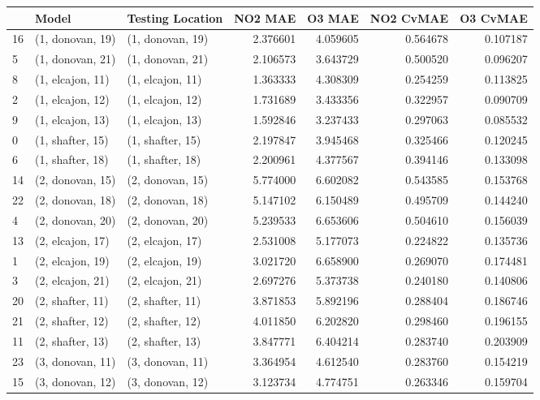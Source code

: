 \begin{tabular}{lllrrrr}
\toprule
{} &             Model &  Testing Location &   NO2 MAE &    O3 MAE &  NO2 CvMAE &  O3 CvMAE \\
\midrule
16 &  (1, donovan, 19) &  (1, donovan, 19) &  2.376601 &  4.059605 &   0.564678 &  0.107187 \\
5  &  (1, donovan, 21) &  (1, donovan, 21) &  2.106573 &  3.643729 &   0.500520 &  0.096207 \\
8  &  (1, elcajon, 11) &  (1, elcajon, 11) &  1.363333 &  4.308309 &   0.254259 &  0.113825 \\
2  &  (1, elcajon, 12) &  (1, elcajon, 12) &  1.731689 &  3.433356 &   0.322957 &  0.090709 \\
9  &  (1, elcajon, 13) &  (1, elcajon, 13) &  1.592846 &  3.237433 &   0.297063 &  0.085532 \\
0  &  (1, shafter, 15) &  (1, shafter, 15) &  2.197847 &  3.945468 &   0.325466 &  0.120245 \\
6  &  (1, shafter, 18) &  (1, shafter, 18) &  2.200961 &  4.377567 &   0.394146 &  0.133098 \\
14 &  (2, donovan, 15) &  (2, donovan, 15) &  5.774000 &  6.602082 &   0.543585 &  0.153768 \\
22 &  (2, donovan, 18) &  (2, donovan, 18) &  5.147102 &  6.150489 &   0.495709 &  0.144240 \\
4  &  (2, donovan, 20) &  (2, donovan, 20) &  5.239533 &  6.653606 &   0.504610 &  0.156039 \\
13 &  (2, elcajon, 17) &  (2, elcajon, 17) &  2.531008 &  5.177073 &   0.224822 &  0.135736 \\
1  &  (2, elcajon, 19) &  (2, elcajon, 19) &  3.021720 &  6.658900 &   0.269070 &  0.174481 \\
3  &  (2, elcajon, 21) &  (2, elcajon, 21) &  2.697276 &  5.373738 &   0.240180 &  0.140806 \\
20 &  (2, shafter, 11) &  (2, shafter, 11) &  3.871853 &  5.892196 &   0.288404 &  0.186746 \\
21 &  (2, shafter, 12) &  (2, shafter, 12) &  4.011850 &  6.202820 &   0.298460 &  0.196155 \\
11 &  (2, shafter, 13) &  (2, shafter, 13) &  3.847771 &  6.404214 &   0.283740 &  0.203909 \\
23 &  (3, donovan, 11) &  (3, donovan, 11) &  3.364954 &  4.612540 &   0.283760 &  0.154219 \\
15 &  (3, donovan, 12) &  (3, donovan, 12) &  3.123734 &  4.774751 &   0.263346 &  0.159704 \\

\end{tabular}
